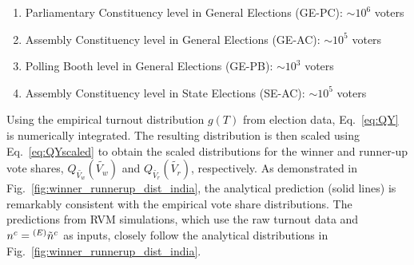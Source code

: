 \begin{enumerate}
    \item Parliamentary Constituency level in General Elections (GE-PC): $\sim 10^6$ voters
    \item Assembly Constituency level in General Elections (GE-AC): $\sim 10^5$ voters
    \item Polling Booth level in General Elections (GE-PB): $\sim 10^3$ voters
    \item Assembly Constituency level in State Elections (SE-AC): $\sim 10^5$ voters
\end{enumerate}
Using the empirical turnout distribution $g(T)$ from election data, Eq.~\ref{eq:QY} is numerically integrated. The resulting distribution is then scaled using Eq.~\ref{eq:QYscaled} to obtain the scaled distributions for the winner and runner-up vote shares, $ Q_{\widetilde{V_w}}(\widetilde{V_w})$ and $Q_{\widetilde{V_r}}(\widetilde{V_r})$, respectively. As demonstrated in Fig.~\ref{fig:winner_runnerup_dist_india}, the analytical prediction (solid lines) is remarkably consistent with the empirical vote share distributions. The predictions from RVM simulations, which use the raw turnout data and $n^c = {^{(E)}\Tilde{n}^c}$ as inputs, closely follow the analytical distributions in Fig.~\ref{fig:winner_runnerup_dist_india}.

